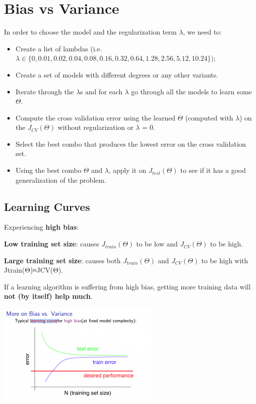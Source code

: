 \documentclass[11pt]{article}
\begin{document}
	\section{Bias vs Variance}
	
		In order to choose the model and the regularization term $\lambda$, we need to:
	
		\begin{itemize}
			\item Create a list of lambdas (i.e. $\lambda \in\{0,0.01,0.02,0.04,0.08,0.16,0.32,0.64,1.28,2.56,5.12,10.24\})$;
			\item Create a set of models with different degrees or any other variants.
			\item Iterate through the $\lambda$s and for each $\lambda$ go through all the models to learn some $\Theta$.
			\item Compute the cross validation error using the learned $\Theta$ (computed with $\lambda$) on the $J_{CV}(\Theta)$ without regularization or $\lambda$ = 0.
			\item Select the best combo that produces the lowest error on the cross validation set.
			\item Using the best combo $\Theta$ and $\lambda$, apply it on $J_{test}(\Theta)$ to see if it has a good generalization of the problem.
		\end{itemize}
		
		\subsection{Learning Curves}
			Experiencing \textbf{high bias}:
			
			
			\textbf{Low training set size}: causes $J_{train}(\Theta)$ to be low and $J_{CV}(\Theta)$ to be high.
		
			\textbf{Large training set size}: causes both $J_{train}(\Theta)$ and $J_{CV}(\Theta)$ to be high with Jtrain(Θ)≈JCV(Θ).
		
			If a learning algorithm is suffering from high bias, getting more training data will \textbf{not (by itself) help much}.	
			
			\includegraphics{high_bias.png}
			
\end{document}
